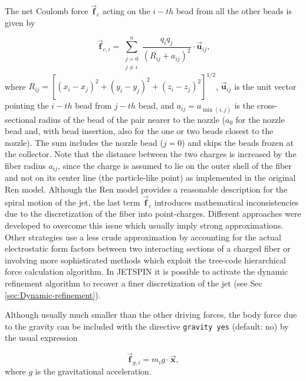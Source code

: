 The net Coulomb force $\vec{\textbf{f}}_{c}$ acting on the $i-th$
bead from all the other beads is given by

\begin{equation}
\vec{\textbf{f}}_{c,i}=\sum_{\substack{j=0\\
j\neq i
}
}^{n}\frac{q_{i}q_{j}}{\left(R_{ij}+a_{ij}\right)^{2}}\cdot\vec{\textbf{u}}_{ij}\text{,}
\end{equation}
where $R_{ij}=\left[\left(x_{i}-x_{j}\right)^{2}+\left(y_{i}-y_{j}\right)^{2}+\left(z_{i}-z_{j}\right)^{2}\right]^{1/2}$,
$\vec{\textbf{u}}_{ij}$ is the unit vector pointing the $i-th$
bead from $j-th$ bead, and $a_{ij}=a_{\min(i,j)}$ is the cross-sectional
radius of the bead of the pair nearer to the nozzle ($a_{0}$ for the
nozzle bead and, with bead insertion, also for the one or two beads
closest to the nozzle). The sum includes the nozzle bead ($j=0$) and
skips the beads frozen at the collector. Note that the distance between
the two charges is increased by the fiber radius $a_{ij}$, since the
charge is assumed to lie on the outer shell of the fiber and not on
its center line (the particle-like point) as
implemented in the original Ren model. Although the Ren model provides
a reasonable description for the spiral motion of the jet, the last
term $\vec{\textbf{f}}_{c}$ introduces mathematical inconsistencies
due to the discretization of the fiber into point-charges. Different
approaches were developed to overcome this issue which usually imply
strong approximations\cite{feng2002stretching,feng2003stretching,hohman2001electrospinning}.
Other strategies use a less crude approximation by accounting for
the actual electrostatic form factors between two interacting sections
of a charged fiber\cite{kowalewski2005experiments} or involving more
sophisticated methods which exploit the tree-code hierarchical force
calculation algorithm\cite{kowalewski2009modeling}. In JETSPIN it
is possible to activate the dynamic refinement algorithm to recover
a finer discretization of the jet (see Sec \ref{sec:Dynamic-refinement}).

Although usually much smaller than the other driving forces, the body
force due to the gravity can be included with the directive
\texttt{gravity yes} (default: no) by the usual expression

\begin{equation}
\vec{\textbf{f}}_{g,i}=m_{i}g\cdot\vec{\textbf{x}},
\end{equation}
where $g$ is the gravitational acceleration.

